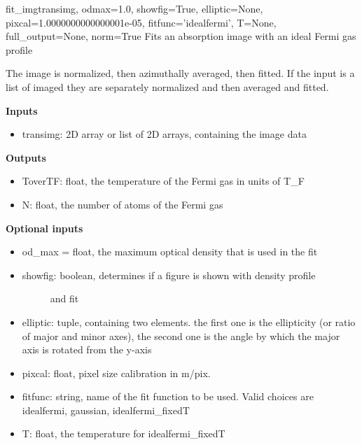 \documentclass[letterpaper,10pt,english]{manual}
\begin{document}
\hypertarget{odysseus.fitfermions.fit_img}{}\begin{funcdesc}{fit\_img}{transimg, odmax=1.0, showfig=True, elliptic=None, pixcal=1.0000000000000001e-05, fitfunc='idealfermi', T=None, full\_output=None, norm=True}
Fits an absorption image with an ideal Fermi gas profile

The image is normalized, then azimuthally averaged, then fitted. If the
input is a list of imaged they are separately normalized and then averaged
and fitted.

\textbf{Inputs}
\begin{itemize}
\item {} 
transimg: 2D array or list of 2D arrays, containing the image data

\end{itemize}

\textbf{Outputs}
\begin{itemize}
\item {} 
ToverTF: float, the temperature of the Fermi gas in units of T\_F

\item {} 
N: float, the number of atoms of the Fermi gas

\end{itemize}

\textbf{Optional inputs}
\begin{itemize}
\item {} 
od\_max = float, the maximum optical density that is used in the fit

\item {} \begin{description}
\item[showfig: boolean, determines if a figure is shown with density profile] \leavevmode
and fit

\end{description}

\item {} 
elliptic: tuple, containing two elements. the first one is the
ellipticity (or ratio of major and minor axes), the second one is the
angle by which the major axis is rotated from the y-axis

\item {} 
pixcal: float, pixel size calibration in m/pix.

\item {} 
fitfunc: string, name of the fit function to be used. Valid choices are
idealfermi, gaussian, idealfermi\_fixedT

\item {} 
T: float, the temperature for idealfermi\_fixedT


\end{itemize}
\end{funcdesc}
\end{document}
